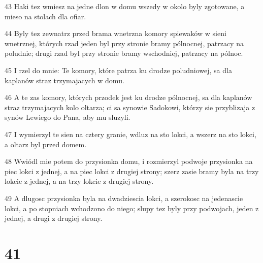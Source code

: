 \par 43 Haki tez wmiesz na jedne dlon w domu wszedy w okolo byly zgotowane, a mieso na stolach dla ofiar.
\par 44 Byly tez zewnatrz przed brama wnetrzna komory spiewaków w sieni wnetrznej, których rzad jeden byl przy stronie bramy pólnocnej, patrzacy na poludnie; drugi rzad byl przy stronie bramy wschodniej, patrzacy na pólnoc.
\par 45 I rzel do mnie: Te komory, które patrza ku drodze poludniowej, sa dla kaplanów straz trzymajacych w domu.
\par 46 A te zas komory, których przodek jest ku drodze pólnocnej, sa dla kaplanów straz trzymajacych kolo oltarza; ci sa synowie Sadokowi, którzy sie przyblizaja z synów Lewiego do Pana, aby mu sluzyli.
\par 47 I wymierzyl te sien na cztery granie, wdluz na sto lokci, a wszerz na sto lokci, a oltarz byl przed domem.
\par 48 Wwiódl mie potem do przysionka domu, i rozmierzyl podwoje przysionka na piec lokci z jednej, a na piec lokci z drugiej strony; szerz zasie bramy byla na trzy lokcie z jednej, a na trzy lokcie z drugiej strony.
\par 49 A dlugosc przysionka byla na dwadziescia lokci, a szerokosc na jedenascie lokci, a po stopniach wchodzono do niego; slupy tez byly przy podwojach, jeden z jednej, a drugi z drugiej strony.

\chapter{41}

